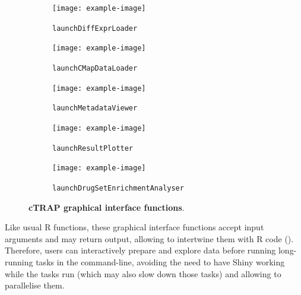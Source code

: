 \begin{figure}[!h]
	\centering
	\begin{subfigure}[h]{0.3\textwidth}
		\texttt{[image: example-image]}
		\caption{\footnotesize{\texttt{launchDiffExprLoader}}}
	\end{subfigure}
	\begin{subfigure}[h]{0.3\textwidth}
		\texttt{[image: example-image]}
		\caption{\footnotesize{\texttt{launchCMapDataLoader}}}
	\end{subfigure}
	\begin{subfigure}[h]{0.3\textwidth}
		\texttt{[image: example-image]}
		\caption{\footnotesize{\texttt{launchMetadataViewer}}}
	\end{subfigure}
	\begin{subfigure}[h]{0.45\textwidth}
		\texttt{[image: example-image]}
		\caption{\footnotesize{\texttt{launchResultPlotter}}}
	\end{subfigure}
	\begin{subfigure}[h]{0.45\textwidth}
		\texttt{[image: example-image]}
		\caption{\footnotesize{\texttt{launchDrugSetEnrichmentAnalyser}}}
	\end{subfigure}
	\caption[cTRAP graphical interface functions]{\textbf{cTRAP graphical interface functions}.}
	\label{fig:ctrap-ui-functions}
\end{figure}

Like usual R functions, these graphical interface functions accept input arguments and may return output, allowing to intertwine them with R code (). Therefore, users can interactively prepare and explore data before running long-running tasks in the command-line, avoiding the need to have Shiny working while the tasks run (which may also slow down those tasks) and allowing to parallelise them.


